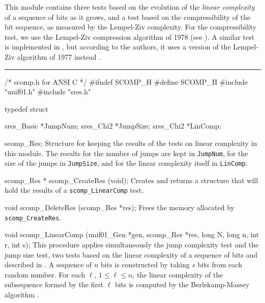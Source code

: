 
This module contains three tests based on the evolution of the 
{\em linear complexity\/} of a sequence of bits as it grows,%
and a test based on the compressibility of the bit sequence,
as measured by the Lempel-Ziv complexity.%
For the compressibility test, we use the Lempel-Ziv compression 
algorithm of 1978 (see \cite{iZIV78a}).
A similar test is implemented in \cite{rERD92a,rRUK01a},
but according to the authors, it uses a version of
the Lempel-Ziv algorithm of 1977 instead \cite{iZIV77a}.
\resdef


\bigskip
\hrule
\code\hide
/* scomp.h  for ANSI C */
#ifndef SCOMP_H
#define SCOMP_H
\endhide
#include "unif01.h"
#include "sres.h"
\endcode

\ifdetailed  %

\code
typedef struct {

   sres_Basic *JumpNum;
   sres_Chi2 *JumpSize;
   sres_Chi2 *LinComp;

} scomp_Res;
\endcode
 \tab
  Structure for keeping the results of the tests on linear complexity
  in this module. The results for the number of jumps are kept in
  {\tt JumpNum}, for the size of the jumps in {\tt JumpSize}, and for the
  linear complexity itself in  {\tt LinComp}.
 \endtab
\code


scomp_Res * scomp_CreateRes (void);
\endcode
 \tab 
  Creates and returns a structure that will hold the results
  of a  {\tt scomp\_LinearComp} test. 
 \endtab
\code


void scomp_DeleteRes (scomp_Res *res);
\endcode
 \tab 
  Frees the memory allocated by {\tt scomp\_CreateRes}.
 \endtab

\fi %



\code
void scomp_LinearComp (unif01_Gen *gen, scomp_Res *res,
                       long N, long n, int r, int s);
\endcode
\tab {} %
  This procedure applies simultaneously the jump complexity test and the jump 
  size test, two tests based on the linear complexity of a sequence of bits and
  described in \cite{rCAR89a,rERD92a}. A sequence of $n$ bits is constructed by
  taking $s$ bits from each random number. For each $\ell$, $1\le \ell\le n$,
  the linear complexity of the subsequence formed by the first $\ell$ bits is
  computed by the  Berlekamp-Massey algorithm \cite{mBER84a,mMAS69a}. 

